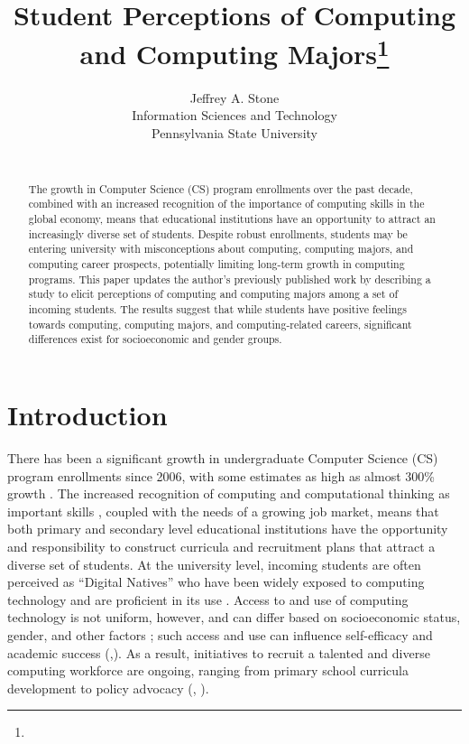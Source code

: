 \documentclass{article}
\title{Student Perceptions of Computing and Computing Majors\footnote{
\protect}}
\author{
Jeffrey A. Stone\\
Information Sciences and Technology\\
Pennsylvania State University\\
\email{stonej@psu.edu}\\
}
\begin{document}
\maketitle

\begin{abstract}
The growth in Computer Science (CS) program enrollments over the past decade, combined with an increased recognition of the importance of computing skills in the global economy, means that educational institutions have an opportunity to attract an increasingly diverse set of students. Despite robust enrollments, students may be entering university with misconceptions about computing, computing majors, and computing career prospects, potentially limiting long-term growth in computing programs. This paper updates the author’s previously published work by describing a study to elicit perceptions of computing and computing majors among a set of incoming students. The results suggest that while students have positive feelings towards computing, computing majors, and computing-related careers, significant differences exist for socioeconomic and gender groups.
\end{abstract}

\section{Introduction}
There has been a significant growth in undergraduate Computer Science (CS) program enrollments since 2006, with some estimates as high as almost 300\% growth \cite{roberts2018rising}. The increased recognition of computing and computational thinking as important skills \cite{grover2014remedying}, coupled with the needs of a growing job market, means that both primary and secondary level educational institutions have the opportunity and responsibility to construct curricula and recruitment plans that attract a diverse set of students. At the university level, incoming students are often perceived as “Digital Natives” who have been widely exposed to computing technology and are proficient in its use \cite{prensky2001digital}. Access to and use of computing technology is not uniform, however, and can differ based on socioeconomic status, gender, and other factors \cite{ritzhaupt2013differences}; such access and use can influence self-efficacy and academic success (\cite{hasan2003influence},\cite{jackson2008race}). As a result, initiatives to recruit a talented and diverse computing workforce are ongoing, ranging from primary school curricula development to policy advocacy (\cite{mcgill2016undergraduate}, \cite{scott2016broadening}).
\end{document}
